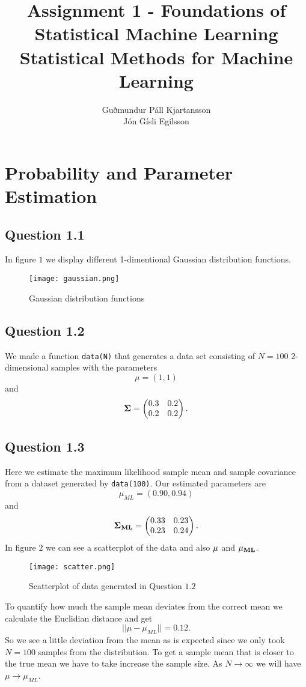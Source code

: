 \documentclass[a4paper,10pt]{article}
\title{
	Assignment 1 - Foundations of Statistical Machine Learning	\\
	Statistical Methods for Machine Learning
  }
\author{
	Guðmundur Páll Kjartansson \\
	Jón Gísli Egilsson
}
\begin{document}
\maketitle

\section*{Probability and Parameter Estimation}

\subsection*{Question 1.1}

In figure $1$ we display different 1-dimentional Gaussian distribution functions.
\begin{figure}[H]
	\centering
  	\texttt{[image: gaussian.png]}
  	\caption{Gaussian distribution functions}
\end{figure}

\subsection*{Question 1.2}

We made a function \verb=data(N)= that generates a data set consisting of $N=100$ 2-dimensional samples with the parameters
$$\mu = (1, 1)$$
and
$$\bf{\Sigma} = \begin{pmatrix} 0.3 & 0.2 \\ 0.2 & 0.2 \end{pmatrix}.$$


\subsection*{Question 1.3}

Here we estimate the maximum likelihood sample mean and sample covariance from a dataset generated by \verb=data(100)=. Our estimated parameters are
$${\mu_{ML}} = (0.90, 0.94)$$
and
$$\bf{\Sigma}_{ML} = \begin{pmatrix} 0.33 & 0.23 \\ 0.23 & 0.24 \end{pmatrix}.$$
In figure $2$ we can see a scatterplot of the data and also $\bf{\mu}$ and $\bf{\mu}_{ML}$.
\begin{figure}[H]
	\centering
  	\texttt{[image: scatter.png]}
  	\caption{Scatterplot of data generated in Question $1.2$}
\end{figure}
To quantify how much the sample mean deviates from the correct mean we calculate the Euclidian distance and get
$$	||\mu - \mu_{ML}|| = 0.12.$$
So we see a little deviation 	from the mean as is expected since we only took $N=100$ samples from the distribution. To get a sample mean that is closer to the true mean we have to take increase the sample size. As $N \to \infty$ we will have $\mu \to \mu_{ML}$.
\end{document}
